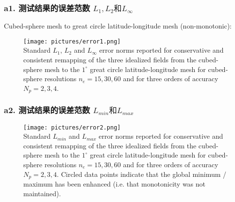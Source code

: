 \documentclass[unknownkeysallowed]{beamer}
\begin{document}
\begin{spacing}{1.2}
\begin{frame}
\frametitle{a1. 测试结果的误差范数  $L_1, L_2 \text{和} L_\infty$}
\scriptsize{Cubed-sphere mesh to great circle latitude-longitude mesh (\textcolor[rgb]{0,0,1}{non-monotonic}):}
\begin{figure}[c]
\texttt{[image: pictures/error1.png]}\\
\tiny{Standard $L_1$, $L_2$ and $L_{\infty}$ error norms reported for conservative and consistent remapping
of the three idealized fields from the cubed-sphere mesh to the $1^\circ$ great circle latitude-longitude
mesh for cubed-sphere resolutions $n_e = 15,30,60$ and for three orders of accuracy $N_p = 2,3,4$.}
\end{figure}
\end{frame}
\begin{frame}
\frametitle{a2. 测试结果的误差范数 $L_{min} \text{和} L_{max}$}
\begin{figure}[c]
\texttt{[image: pictures/error2.png]}\\
\tiny{Standard $L_{min}$ and $L_{max}$ error norms reported for conservative and consistent remapping
of the three idealized fields from the cubed-sphere mesh to the $1^\circ$ great circle latitude-longitude
mesh for cubed-sphere resolutions $n_e = 15,30,60$ and for three orders of accuracy $N_p = 2,3,4$. Circled data points indicate that the global minimum / maximum has been enhanced (i.e. that monotonicity was not maintained).}
\end{figure}
\end{frame}



\end{spacing}
\end{document}
